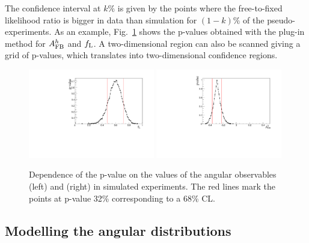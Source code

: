The confidence interval at $k\%$ is given by the points where the free-to-fixed likelihood ratio is bigger in data than
simulation for $(1-k)\%$ of the pseudo-experiments. As an example, Fig.~\ref{fig:FCexample} shows the p-values obtained
with the plug-in method for $A_{\rm FB}^h$ and $f_{\rm L}$. A two-dimensional region 
can also be scanned giving a grid of p-values, which translates into two-dimensional confidence regions.
%
\begin{figure}[h!]
\centering
\includegraphics[width=0.49\textwidth]{Lmumu/figs/pvalue_fL_1500_2000.pdf}
\includegraphics[width=0.49\textwidth]{Lmumu/figs/pvalue_afbB_1500_2000.pdf}
\caption{ Dependence of the p-value on the values of the angular observables \fl (left) 
and \afbh (right) in simulated experiments. The red lines mark the points
at p-value 32\% corresponding to a 68\% CL.}
\label{fig:FCexample}
\end{figure}

\subsection{Modelling the angular distributions}
\label{sec:angfit}


